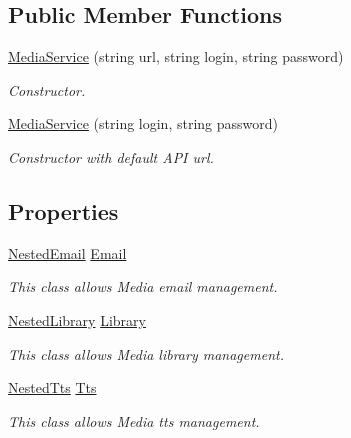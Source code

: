 \subsection*{Public Member Functions}
\begin{DoxyCompactItemize}
\item 
\hyperlink{class_thecallr_api_1_1_services_1_1_client_1_1_media_service_a93575b71dc17663da39eed9fec08ede8}{Media\+Service} (string url, string login, string password)
\begin{DoxyCompactList}\small\item\em Constructor. \end{DoxyCompactList}\item 
\hyperlink{class_thecallr_api_1_1_services_1_1_client_1_1_media_service_a39611e6545e4a68f02d818319a4f6995}{Media\+Service} (string login, string password)
\begin{DoxyCompactList}\small\item\em Constructor with default A\+P\+I url. \end{DoxyCompactList}\end{DoxyCompactItemize}
\subsection*{Properties}
\begin{DoxyCompactItemize}
\item 
\hyperlink{class_thecallr_api_1_1_services_1_1_client_1_1_media_service_1_1_nested_email}{Nested\+Email} \hyperlink{class_thecallr_api_1_1_services_1_1_client_1_1_media_service_ae089b8524249479ae223ac30c91a7405}{Email}
\begin{DoxyCompactList}\small\item\em This class allows Media email management. \end{DoxyCompactList}\item 
\hyperlink{class_thecallr_api_1_1_services_1_1_client_1_1_media_service_1_1_nested_library}{Nested\+Library} \hyperlink{class_thecallr_api_1_1_services_1_1_client_1_1_media_service_a896317fa88b888876ea5bbb530d130ef}{Library}
\begin{DoxyCompactList}\small\item\em This class allows Media library management. \end{DoxyCompactList}\item 
\hyperlink{class_thecallr_api_1_1_services_1_1_client_1_1_media_service_1_1_nested_tts}{Nested\+Tts} \hyperlink{class_thecallr_api_1_1_services_1_1_client_1_1_media_service_a4b8075ed42ba760aea9598f48471c0f5}{Tts}
\begin{DoxyCompactList}\small\item\em This class allows Media tts management. \end{DoxyCompactList}\end{DoxyCompactItemize}


